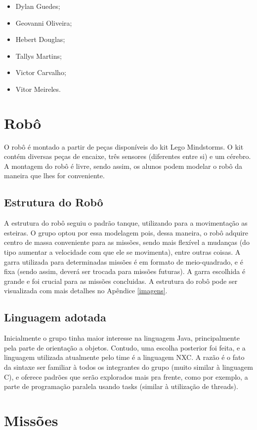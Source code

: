 \begin{itemize}
\item Dylan Guedes;
\item Geovanni Oliveira;
\item Hebert Douglas;
\item Tallys Martins;
\item Victor Carvalho;
\item Vitor Meireles.
\end{itemize}

\chapter{Robô}
O robô é montado a partir de peças disponíveis do kit Lego Mindstorms. O kit contém diversas peças de encaixe, três sensores (diferentes entre si) e um cérebro. A montagem do robô é livre, sendo assim, os alunos podem modelar o robô da maneira que lhes for conveniente.

\section{Estrutura do Robô}
A estrutura do robô seguiu o padrão tanque, utilizando para a movimentação as esteiras. O grupo optou por essa modelagem pois, dessa maneira, o robô adquire centro de massa conveniente para as missões, sendo mais flexível a mudanças (do tipo aumentar a velocidade com que ele se movimenta), entre outras coisas. A garra utilizada para determinadas missões é em formato de meio-quadrado, e é fixa (sendo assim, deverá ser trocada para missões futuras). A garra escolhida é grande e foi crucial para as missões concluidas. A estrutura do robô pode ser visualizada com mais detalhes no Apêndice \ref{imagens}.

\section{Linguagem adotada}
Inicialmente o grupo tinha maior interesse na linguagem Java, principalmente pela parte de orientação a objetos. Contudo, uma escolha posterior foi feita, e a linguagem utilizada atualmente pelo time é a linguagem NXC. A razão é o fato da sintaxe ser familiar à todos os integrantes do grupo (muito similar à linguagem C), e oferece padrões que serão explorados mais pra frente, como por exemplo, a parte de programação paralela usando tasks (similar à utilização de threads).

\chapter{Missões}
